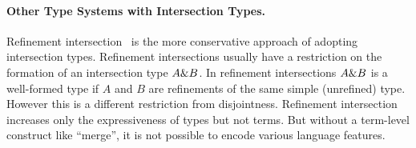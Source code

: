 \begin{comment}
only allow intersections of concrete types (classes),
whereas our language allows intersections of type variables, such as
\texttt{A \& B}. Without that vehicle, we would not be able to define
the generic \texttt{merge} function (below) for all interpretations of
a given algebra, and would incur boilerplate code:

\begin{lstlisting}
let merge [A, B] (f: ExpAlg A) (g: ExpAlg B) = {
  lit (x : Int) = f.lit x ,, g.lit x,
  add (x : A & B) (y : A & B) =
    f.add x y ,, g.add x y
}
\end{lstlisting}
\end{comment}

\paragraph{Other Type Systems with Intersection Types.}

Refinement
intersection~\cite{dunfield2007refined,davies2005practical,freeman1991refinement}
is the more conservative approach of adopting intersection types. 
Refinement intersections usually have a restriction on the formation
of an intersection type $A \& B$. In refinement intersections
$A \& B$ is a well-formed type if $A$ and $B$ are
refinements of the same simple (unrefined) type. However this is a
different restriction from disjointness. Refinement intersection increases
only the expressiveness of types but not terms. But without a term-level
construct like ``merge'', it is not possible to encode various language
features. 


